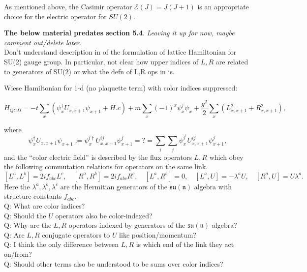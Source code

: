 \documentclass[11pt,reqno]{amsart}
\numberwithin{equation}{section}
\begin{document}
	As mentioned above, the Casimir operator $\mathcal{E}(J)=J(J+1)$ is an appropriate choice for the electric operator for $SU(2)$.

	\textbf{The below material predates section 5.4}. \textit{Leaving it up for now, maybe comment out/delete later.}\\
	
	Don't understand description in \cite{KogutSusskind75,Wiese13} of the formulation of lattice Hamiltonian for SU(2) gauge group.
	In particular, not clear how upper indices of $L,R$ are related to generators of SU(2) or what the defn of L,R ops in \cite{Wiese13} is.
	
	Wiese Hamiltonian for 1-d (no plaquette term) with color indices suppressed:
	
	\begin{equation}
		H_{QCD}=-t\sum_{x} (\psi_x^\dagger U_{x,x+1} \psi_{x+1} + H.c) + m \sum_{x} (-1)^x \psi_x^\dagger\psi_x + \frac{g^2}{2} \sum_{x} (L_{x,x+1}^2+R_{x,x+1}^2),
	\end{equation}
	
	where 
		\[\psi_x^\dagger U_{x,x+1} \psi_{x+1} := \psi_x^{i\dagger} U_{x,x+1}^{ij} \psi_{x+1}^j =?= \sum_i \sum_j \psi_x^{i^\dagger} U_{x,x+1}^{ij} \psi_{x+1}^j,\]
	and the ``color electric field'' is described by the flux operators $L,R$ which obey the following commutation relations for operators on the same link.
		\[ [L^a,L^b]=2if_{abc}L^c, \quad [R^a,R^b]=2if_{abc}R^c, \quad [L^a,R^b]=0, \quad [L^a,U]=-\lambda^a U, \quad [R^a,U]=U\lambda^a. \]
	Here the $\lambda^a,\lambda^b,\lambda^c$ are the Hermitian generators of the $\mathfrak{su(n)}$ algebra with structure constants $f_{abc}$.\\
	
	\noindent Q: What are color indices?\\
	Q: Should the $U$ operators also be color-indexed?\\
	Q: Why are the $L,R$ operators indexed by generators of the $\mathfrak{su(n)}$ algebra?\\
	Q: Are $L,R$ conjugate operators to $U$ like position/momentum?\\
	Q: I think the only difference between $L,R$ is which end of the link they act on/from?\\
	Q: Should other terms also be understood to be sums over color indices? 

	
	
	
	\nocite{Hamer82}
	\nocite{AKHvD11}
	\nocite{Zohar_2015}
\end{document}
